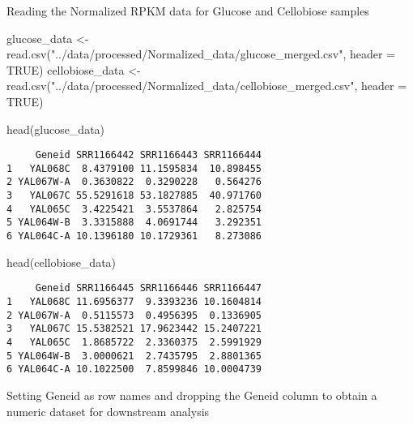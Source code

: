 \documentclass[
  letterpaper,
  DIV=11,
  numbers=noendperiod]{scrartcl}
\newenvironment{Shaded}{\begin{snugshade}}{\end{snugshade}}
\newcommand{\AttributeTok}[1]{\textcolor[rgb]{0.40,0.45,0.13}{#1}}
\newcommand{\ConstantTok}[1]{\textcolor[rgb]{0.56,0.35,0.01}{#1}}
\newcommand{\DecValTok}[1]{\textcolor[rgb]{0.68,0.00,0.00}{#1}}
\newcommand{\FunctionTok}[1]{\textcolor[rgb]{0.28,0.35,0.67}{#1}}
\newcommand{\NormalTok}[1]{\textcolor[rgb]{0.00,0.23,0.31}{#1}}
\newcommand{\OtherTok}[1]{\textcolor[rgb]{0.00,0.23,0.31}{#1}}
\newcommand{\SpecialCharTok}[1]{\textcolor[rgb]{0.37,0.37,0.37}{#1}}
\newcommand{\StringTok}[1]{\textcolor[rgb]{0.13,0.47,0.30}{#1}}
\begin{document}
Reading the Normalized RPKM data for Glucose and Cellobiose samples

\begin{Shaded}
\begin{Highlighting}[]
\NormalTok{glucose\_data }\OtherTok{\textless{}{-}} \FunctionTok{read.csv}\NormalTok{(}\StringTok{"../data/processed/Normalized\_data/glucose\_merged.csv"}\NormalTok{, }\AttributeTok{header =} \ConstantTok{TRUE}\NormalTok{)}
\NormalTok{cellobiose\_data }\OtherTok{\textless{}{-}} \FunctionTok{read.csv}\NormalTok{(}\StringTok{"../data/processed/Normalized\_data/cellobiose\_merged.csv"}\NormalTok{, }\AttributeTok{header =} \ConstantTok{TRUE}\NormalTok{)}

\FunctionTok{head}\NormalTok{(glucose\_data)}
\end{Highlighting}
\end{Shaded}

\begin{verbatim}
     Geneid SRR1166442 SRR1166443 SRR1166444
1   YAL068C  8.4379100 11.1595834  10.898455
2 YAL067W-A  0.3630822  0.3290228   0.564276
3   YAL067C 55.5291618 53.1827885  40.971760
4   YAL065C  3.4225421  3.5537864   2.825754
5 YAL064W-B  3.3315888  4.0691744   3.292351
6 YAL064C-A 10.1396180 10.1729361   8.273086
\end{verbatim}

\begin{Shaded}
\begin{Highlighting}[]
\FunctionTok{head}\NormalTok{(cellobiose\_data)}
\end{Highlighting}
\end{Shaded}

\begin{verbatim}
     Geneid SRR1166445 SRR1166446 SRR1166447
1   YAL068C 11.6956377  9.3393236 10.1604814
2 YAL067W-A  0.5115573  0.4956395  0.1336905
3   YAL067C 15.5382521 17.9623442 15.2407221
4   YAL065C  1.8685722  2.3360375  2.5991929
5 YAL064W-B  3.0000621  2.7435795  2.8801365
6 YAL064C-A 10.1022500  7.8599846 10.0004739
\end{verbatim}

Setting Geneid as row names and dropping the Geneid column to obtain a
numeric dataset for downstream analysis

\begin{Shaded}
\end{Shaded}
\end{document}
